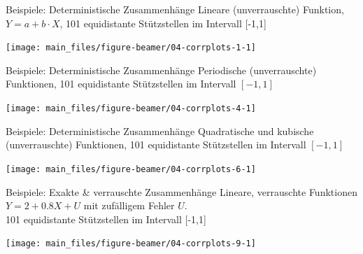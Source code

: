 \documentclass[
  10pt,
  ignorenonframetext,
]{beamer}
\begin{document}
\begin{frame}{Beispiele: Deterministische Zusammenhänge}
\label{beispiele-deterministische-zusammenhuxe4nge}
Lineare (unverrauschte) Funktion, \(Y = a + b \cdot X\), 101
equidistante Stützstellen im Intervall {[}-1,1{]} \scriptsize

\begin{center}\texttt{[image: main\_files/figure-beamer/04-corrplots-1-1]} \end{center}

\normalsize
\end{frame}

\begin{frame}{Beispiele: Deterministische Zusammenhänge}
\label{beispiele-deterministische-zusammenhuxe4nge-1}
Periodische (unverrauschte) Funktionen, 101 equidistante Stützstellen im
Intervall \([-1, 1]\)

\scriptsize

\begin{center}\texttt{[image: main\_files/figure-beamer/04-corrplots-4-1]} \end{center}

\normalsize
\end{frame}

\begin{frame}{Beispiele: Deterministische Zusammenhänge}
\label{beispiele-deterministische-zusammenhuxe4nge-2}
Quadratische und kubische (unverrauschte) Funktionen, 101 equidistante
Stützstellen im Intervall \([-1,1]\)

\scriptsize

\begin{center}\texttt{[image: main\_files/figure-beamer/04-corrplots-6-1]} \end{center}

\normalsize
\end{frame}

\begin{frame}{Beispiele: Exakte \& verrauschte Zusammenhänge}
\label{beispiele-exakte-verrauschte-zusammenhuxe4nge}
Lineare, verrauschte Funktionen \(Y = 2 + 0.8 X + U\) mit zufälligem
Fehler \(U\).\\
101 equidistante Stützstellen im Intervall {[}-1,1{]}

\scriptsize

\begin{center}\texttt{[image: main\_files/figure-beamer/04-corrplots-9-1]} \end{center}

\normalsize
\end{frame}
\end{document}
